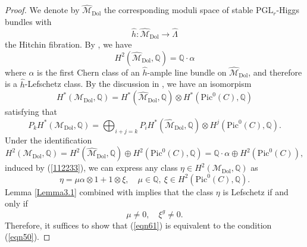 \documentclass[11pt]{amsart}
\theoremstyle{plain}
\theoremstyle{definition}
\theoremstyle{remark}
\newcommand{\BQ}{{\mathbb{Q}}}
\newcommand{\CM}{{\mathcal M}}
\begin{document}
\begin{proof}
 We denote by $\hat{\CM}_{\mathrm{Dol}}$ the corresponding moduli space of stable $\mathrm{PGL}_r$-Higgs bundles with
\[
\hat{h}: \hat{\CM}_{\mathrm{Dol}} \to \hat{\Lambda}
\]
the Hitchin fibration. By \cite{HT1, Markman}, we have
\[
H^2( \hat{\CM}_{\mathrm{Dol}}, \BQ ) = \BQ \cdot \alpha
\]
where $\alpha$ is the first Chern class of an $\hat{h}$-ample line bundle on   $\hat{\CM}_{\mathrm{Dol}}$, and therefore is
a $\hat{h}$-Lefschetz class. By the discussion in \cite[Section 2.4]{dCHM1}, we have an isomorpism
\begin{equation}\label{112233}
H^*(\CM_{\mathrm{Dol}}, \BQ) = H^*( \hat{\CM}_{\mathrm{Dol}}, \BQ ) \otimes H^*(\mathrm{Pic}^0(C), \BQ)
\end{equation}
satisfying that
\begin{equation}\label{eqn71}
P_k H^*(\CM_{\mathrm{Dol}}, \BQ) = \bigoplus_{i+j=k} P_iH^*( \hat{\CM}_{\mathrm{Dol}}, \BQ ) \otimes H^j(\mathrm{Pic}^0(C), \BQ).
\end{equation}
Under the identification 
\[
H^2(\CM_{\mathrm{Dol}}, \BQ) = H^2( \hat{\CM}_{\mathrm{Dol}}, \BQ ) \oplus H^2(\mathrm{Pic}^0(C), \BQ) = \BQ \cdot \alpha  \oplus H^2(\mathrm{Pic}^0(C)),
\]
induced by (\ref{112233}), we can express any class $\eta \in H^2(\CM_{\mathrm{Dol}}, \BQ)$ as
\begin{equation}\label{123eta}
\eta = \mu {\alpha  \otimes 1+ 1\otimes \xi}, \quad \mu \in \BQ,~ \xi \in H^2(\mathrm{Pic}^0(C), \BQ).  
\end{equation}
Lemma \ref{Lemma3.1} {combined with \cite[Appendix]{dC}} implies that the class $\eta$ is Lefschetz if and only if 
\begin{equation}\label{eqn61}
\mu \neq 0, \quad \xi^g\neq 0.
\end{equation}
Therefore, it suffices to show that (\ref{eqn61}) is equivalent to the condition (\ref{eqn50}).


\end{proof}
\end{document}
